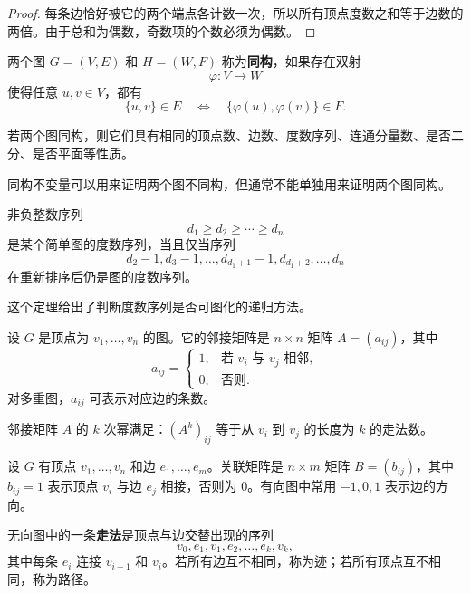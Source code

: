 \begin{proof}
每条边恰好被它的两个端点各计数一次，所以所有顶点度数之和等于边数的两倍。由于总和为偶数，奇数项的个数必须为偶数。
\end{proof}

\begin{definition}[图同构]
两个图 $G=(V,E)$ 和 $H=(W,F)$ 称为\textbf{同构}，如果存在双射
\[
    \varphi:V\to W
\]
使得任意 $u,v\in V$，都有
\[
    \{u,v\}\in E
    \quad\Longleftrightarrow\quad
    \{\varphi(u),\varphi(v)\}\in F.
\]
\end{definition}

\begin{theorem}[同构不变量]
若两个图同构，则它们具有相同的顶点数、边数、度数序列、连通分量数、是否二分、是否平面等性质。
\end{theorem}

同构不变量可以用来证明两个图不同构，但通常不能单独用来证明两个图同构。

\begin{theorem}
非负整数序列
\[
    d_1\ge d_2\ge\cdots\ge d_n
\]
是某个简单图的度数序列，当且仅当序列
\[
    d_2-1,d_3-1,\dots,d_{d_1+1}-1,d_{d_1+2},\dots,d_n
\]
在重新排序后仍是图的度数序列。
\end{theorem}

这个定理给出了判断度数序列是否可图化的递归方法。

\begin{definition}[邻接矩阵]
设 $G$ 是顶点为 $v_1,\dots,v_n$ 的图。它的邻接矩阵是 $n\times n$ 矩阵 $A=(a_{ij})$，其中
\[
    a_{ij}=
    \begin{cases}
    1,&\text{若 }v_i\text{ 与 }v_j\text{ 相邻},\\
    0,&\text{否则}.
    \end{cases}
\]
对多重图，$a_{ij}$ 可表示对应边的条数。
\end{definition}

\begin{theorem}
邻接矩阵 $A$ 的 $k$ 次幂满足：$(A^k)_{ij}$ 等于从 $v_i$ 到 $v_j$ 的长度为 $k$ 的走法数。
\end{theorem}

\begin{definition}[关联矩阵]
设 $G$ 有顶点 $v_1,\dots,v_n$ 和边 $e_1,\dots,e_m$。关联矩阵是 $n\times m$ 矩阵 $B=(b_{ij})$，其中 $b_{ij}=1$ 表示顶点 $v_i$ 与边 $e_j$ 相接，否则为 $0$。有向图中常用 $-1,0,1$ 表示边的方向。
\end{definition}

\begin{definition}[无向图中的路]
无向图中的一条\textbf{走法}是顶点与边交替出现的序列
\[
    v_0,e_1,v_1,e_2,\dots,e_k,v_k,
\]
其中每条 $e_i$ 连接 $v_{i-1}$ 和 $v_i$。若所有边互不相同，称为迹；若所有顶点互不相同，称为路径。
\end{definition}

